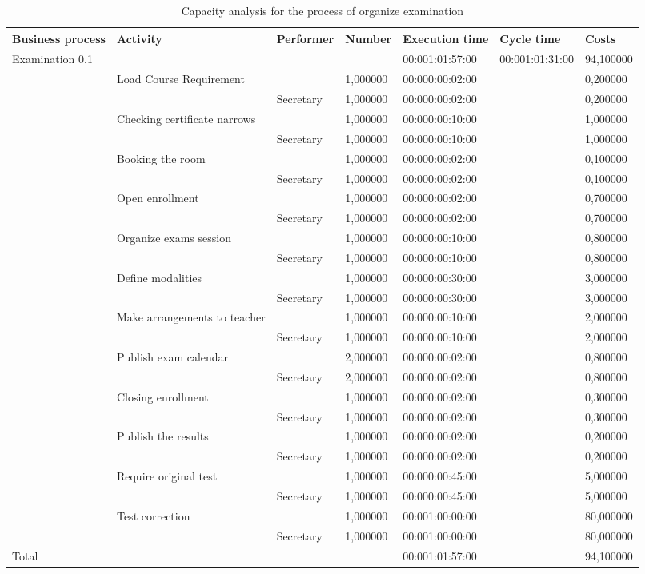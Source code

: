 \begin{landscape}
\centering
\begin{table}
{\tiny
\begin{tabular}{|l|l|l|l|l|l|l|}
Business process&Activity&Performer&Number&Execution time&Cycle
time&Costs\\
\hline
Examination 0.1&&&&00:001:01:57:00&00:001:01:31:00&94,100000\\
\hline
&Load Course Requirement &&1,000000&00:000:00:02:00&&0,200000\\
\hline
&&Secretary &1,000000&00:000:00:02:00&&0,200000\\
\hline
&Checking certificate narrows &&1,000000&00:000:00:10:00&&1,000000\\
\hline
&&Secretary &1,000000&00:000:00:10:00&&1,000000\\
\hline
&Booking the room &&1,000000&00:000:00:02:00&&0,100000\\
\hline
&&Secretary &1,000000&00:000:00:02:00&&0,100000\\
\hline
&Open enrollment &&1,000000&00:000:00:02:00&&0,700000\\
\hline
&&Secretary &1,000000&00:000:00:02:00&&0,700000\\
\hline
&Organize exams session &&1,000000&00:000:00:10:00&&0,800000\\
\hline
&&Secretary &1,000000&00:000:00:10:00&&0,800000\\
\hline
&Define modalities &&1,000000&00:000:00:30:00&&3,000000\\
\hline
&&Secretary &1,000000&00:000:00:30:00&&3,000000\\
\hline
&Make arrangements to teacher &&1,000000&00:000:00:10:00&&2,000000\\
\hline
&&Secretary &1,000000&00:000:00:10:00&&2,000000\\
\hline
&Publish exam calendar &&2,000000&00:000:00:02:00&&0,800000\\
\hline
&&Secretary &2,000000&00:000:00:02:00&&0,800000\\
\hline
&Closing enrollment &&1,000000&00:000:00:02:00&&0,300000\\
\hline
&&Secretary &1,000000&00:000:00:02:00&&0,300000\\
\hline
&Publish the results &&1,000000&00:000:00:02:00&&0,200000\\
\hline
&&Secretary &1,000000&00:000:00:02:00&&0,200000\\
\hline
&Require original test &&1,000000&00:000:00:45:00&&5,000000\\
\hline
&&Secretary &1,000000&00:000:00:45:00&&5,000000\\
\hline
&Test correction &&1,000000&00:001:00:00:00&&80,000000\\
\hline
&&Secretary &1,000000&00:001:00:00:00&&80,000000\\
\hline
Total&&&&00:001:01:57:00&&94,100000\\
\hline
\end{tabular}
}
\caption{Capacity analysis for the process of organize examination} 
\label{2tab:exam}
\end{table}
\end{landscape}




